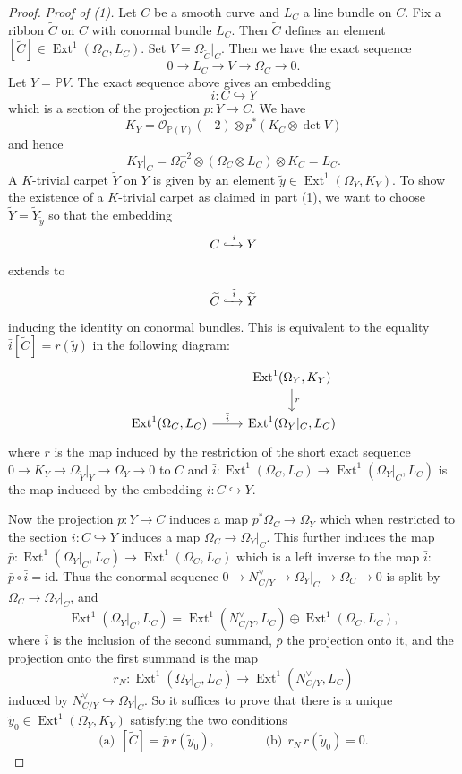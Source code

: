 \documentclass[11pt,reqno]{amsart}
\theoremstyle{plain}
\theoremstyle{definition}
\newcommand{\PP}{\mathbb{P}}
\newcommand{\OO}{\mathcal{O}}
\newcommand{\Ext}{\operatorname{Ext}}
\newcommand{\id}{\mathrm{id}}
\newcommand{\Yt}{\widetilde{Y}}
\newcommand{\Ct}{\widetilde{C}}
\newcommand{\yt}{\tilde{y}}
\begin{document}
\begin{proof}
\emph{Proof of (1).} Let $C$ be a smooth curve and $L_C$ a line bundle on $C$. Fix a ribbon $\Ct$ on $C$ with conormal bundle $L_C$. Then $\Ct$ defines an element $[\Ct]\in\Ext^1(\Omega_C,L_C)$. Set $V=\Omega_{\Ct}|_C$. Then we have the exact sequence
\[
0\to L_C\to V\to\Omega_C\to0 .
\]
Let $Y=\PP V$. The exact sequence above gives an embedding
\[
i\colon C\hookrightarrow Y
\]
which is a section of the projection $p\colon Y\to C$. We have
\[
K_Y=\OO_{\PP(V)}(-2)\otimes p^*(K_C\otimes\det V)
\]
and hence
\[
K_Y|_C=\Omega_C^{-2}\otimes(\Omega_C\otimes L_C)\otimes K_C=L_C .
\]
A $K$-trivial carpet $\Yt$ on $Y$ is given by an element $\yt\in\Ext^1(\Omega_Y,K_Y)$. To show the existence of a $K$-trivial carpet as claimed in part (1), we want to choose $\Yt=\Yt_{\yt}$ so that the embedding
\[
C\xhookrightarrow{\ i\ }Y
\]
extends to
\[
\Ct\xhookrightarrow{\ \tilde i\ }\Yt
\]
inducing the identity on conormal bundles. This is equivalent to the equality $\bar i[\Ct]=r(\yt)$ in the following diagram:
\begin{equation}\label{diag:ext}
\begin{tikzcd}
& \Ext^1(\Omega_Y,K_Y)\arrow[d,"r"]\\
\Ext^1(\Omega_C,L_C)\arrow[r,"\bar i"] & \Ext^1(\Omega_Y|_C,L_C)
\end{tikzcd}
\end{equation}
where $r$ is the map induced by the restriction of the short exact sequence $0\to K_Y\to\Omega_{\Yt}|_Y\to\Omega_Y\to0$ to $C$ and $\bar i\colon\Ext^1(\Omega_C,L_C)\to\Ext^1(\Omega_Y|_C,L_C)$ is the map induced by the embedding $i\colon C\hookrightarrow Y$.

Now the projection $p\colon Y\to C$ induces a map $p^*\Omega_C\to\Omega_Y$ which when restricted to the section $i\colon C\hookrightarrow Y$ induces a map $\Omega_C\to\Omega_Y|_C$. This further induces the map $\bar p\colon\Ext^1(\Omega_Y|_C,L_C)\to\Ext^1(\Omega_C,L_C)$ which is a left inverse to the map $\bar i$: $\bar p\circ\bar i=\id$. Thus the conormal sequence $0\to N_{C/Y}^{\vee}\to\Omega_Y|_C\to\Omega_C\to0$ is split by $\Omega_C\to\Omega_Y|_C$, and
\begin{equation}\label{eq:extsplit}
\Ext^1(\Omega_Y|_C,L_C)=\Ext^1(N_{C/Y}^{\vee},L_C)\oplus\Ext^1(\Omega_C,L_C),
\end{equation}
where $\bar i$ is the inclusion of the second summand, $\bar p$ the projection onto it, and the projection onto the first summand is the map
\[
r_N\colon\Ext^1(\Omega_Y|_C,L_C)\to\Ext^1(N_{C/Y}^{\vee},L_C)
\]
induced by $N_{C/Y}^{\vee}\hookrightarrow\Omega_Y|_C$. So it suffices to prove that there is a unique $\yt_0\in\Ext^1(\Omega_Y,K_Y)$ satisfying the two conditions
\begin{equation}\label{eq:twoconditions}
\text{(a)}\ \ [\Ct]=\bar p\,r(\yt_0),\qquad\qquad\text{(b)}\ \ r_N\,r(\yt_0)=0 .
\end{equation}


\end{proof}
\end{document}
